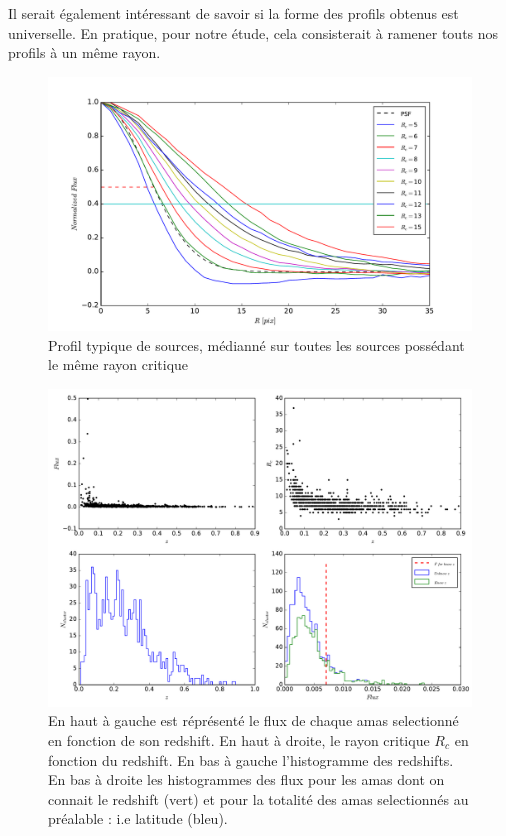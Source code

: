 \documentclass[a4paper,11pt]{article}
\begin{document}
Il serait également intéressant de savoir si la forme des profils obtenus est universelle. En pratique, pour notre
étude, cela consisterait à ramener touts nos profils à un même rayon.

\begin{figure}[h!]
  \centering
  \label{profils_medians}
  \label{radius}
  \includegraphics[scale = 0.5]{radius.pdf}
  \caption{Profil typique de sources, médianné sur toutes les sources possédant le même rayon critique}
\end{figure}

\begin{figure}[h!]
  \centering
  \label{rslt_1}
  \includegraphics[scale = 0.4]{rslt_1.pdf}
  \caption{En haut à gauche est réprésenté le flux de chaque amas
    selectionné en fonction de son redshift. En haut à droite, le rayon critique
    $R_c$ en fonction du redshift. En bas à gauche l'histogramme des
    redshifts. En bas à droite les histogrammes des flux pour les amas
    dont on connait le redshift (vert) et pour la totalité des amas
    selectionnés au préalable : i.e latitude (bleu).}
\end{figure}
\end{document}
